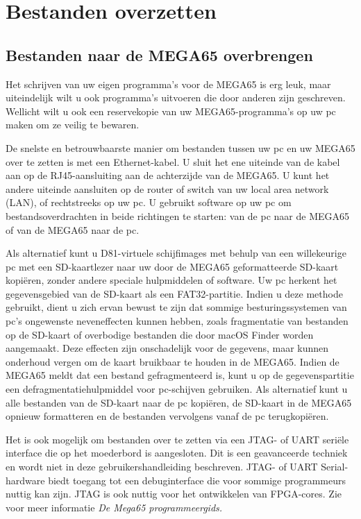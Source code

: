 \chapter{Bestanden overzetten}

\section{Bestanden naar de MEGA65 overbrengen}
\label{cha:transferring-files}

Het schrijven van uw eigen programma's voor de MEGA65 is erg leuk, maar uiteindelijk wilt u ook programma's uitvoeren die door anderen zijn geschreven. Wellicht wilt u ook een reservekopie van uw MEGA65-programma's op uw pc maken om ze veilig te bewaren.

De snelste en betrouwbaarste manier om bestanden tussen uw pc en uw MEGA65 over te zetten is met een Ethernet-kabel. U sluit het ene uiteinde van de kabel aan op de RJ45-aansluiting aan de achterzijde van de MEGA65. U kunt het andere uiteinde aansluiten op de router of switch van uw local area network (LAN), of rechtstreeks op uw pc. U gebruikt software op uw pc om bestandsoverdrachten in beide richtingen te starten: van de pc naar de MEGA65 of van de MEGA65 naar de pc.

Als alternatief kunt u D81-virtuele schijfimages met behulp van een willekeurige pc met een SD-kaartlezer naar uw door de MEGA65 geformatteerde SD-kaart kopiëren, zonder andere speciale hulpmiddelen of software. Uw pc herkent het gegevensgebied van de SD-kaart als een FAT32-partitie. Indien u deze methode gebruikt, dient u zich ervan bewust te zijn dat sommige besturingssystemen van pc's ongewenste neveneffecten kunnen hebben, zoals fragmentatie van bestanden op de SD-kaart of overbodige bestanden die door macOS Finder worden aangemaakt. Deze effecten zijn onschadelijk voor de gegevens, maar kunnen onderhoud vergen om de kaart bruikbaar te houden in de MEGA65. Indien de MEGA65 meldt dat een bestand gefragmenteerd is, kunt u op de gegevenspartitie een defragmentatiehulpmiddel voor pc-schijven gebruiken. Als alternatief kunt u alle bestanden van de SD-kaart naar de pc kopiëren, de SD-kaart in de MEGA65 opnieuw formatteren en de bestanden vervolgens vanaf de pc terugkopiëren.

Het is ook mogelijk om bestanden over te zetten via een JTAG- of UART seriële interface die op het moederbord is aangesloten. Dit is een geavanceerde techniek en wordt niet in deze gebruikershandleiding beschreven. JTAG- of UART Serial-hardware biedt toegang tot een debuginterface die voor sommige programmeurs nuttig kan zijn. JTAG is ook nuttig voor het ontwikkelen van FPGA-cores. Zie voor meer informatie {\it De Mega65 programmeergids.}

